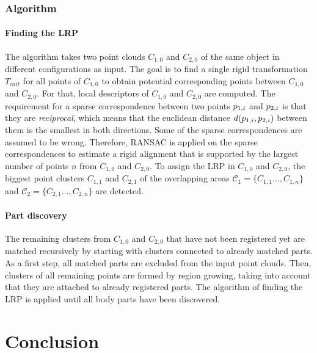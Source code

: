 \documentclass[notitlepage,english]{hgbreport}
\begin{document}
	\subsection{Algorithm} 
	
	\subsubsection{Finding the LRP}
	
	The algorithm takes two point clouds $C_{1,0}$ and $C_{2,0}$ of the same object in different configurations as input.
	The goal is to find a single rigid transformation $T_{init}$ for all points of $C_{1,0}$ to obtain potential corresponding points between $C_{1,0}$ and $C_{2,0}$. For that, local descriptors of $C_{1,0}$ and $C_{2,0}$ are computed. The requirement for a sparse correspondence between two points $\boldmath{p}_{1,i}$ and $\boldmath{p}_{2,i}$  is that they are \textit{reciprocal}, which means that the euclidean distance $d(\boldmath{p}_{1,i}, \boldmath{p}_{2,i})$ between them is the smallest in both directions. Some of the sparse correspondences are assumed to be wrong. Therefore, RANSAC is applied on the sparse correspondences  to estimate a rigid alignment that is supported by the largest number of points $n$ from $C_{1,0}$ and $C_{2,0}$. To assign the LRP in $C_{1,0}$ and $C_{2,0}$, the biggest point clusters $C_{1,1}$ and $C_{2,1}$ of the overlapping areas $\mathcal{C}_1 = \{C_{1,1}\ldots,C_{1,n}\}$ and  $\mathcal{C}_2 = \{C_{2,1}\ldots,C_{2,n}\}$ are detected. 
	
	
	\subsubsection{Part discovery}
	
	The remaining clusters from $C_{1,0}$ and $C_{2,0}$ that have not been registered yet are matched recursively by starting with clusters connected to already matched parts. As a first step, all matched parts are excluded from the input point clouds. Then, clusters of all remaining points are formed by region growing, taking into account that they are attached to already registered parts. The algorithm of finding the LRP is applied until all body parts have been discovered.

	
	\chapter{Conclusion}
	
\end{document}
